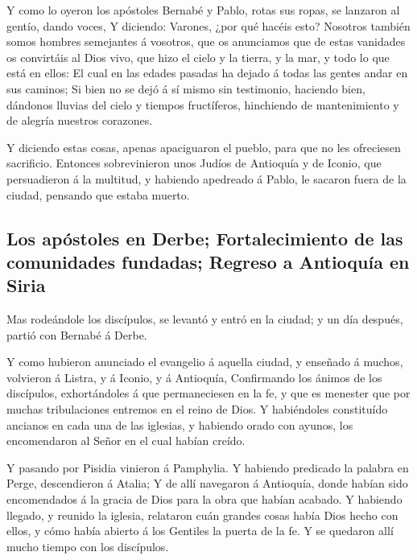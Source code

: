  Y como lo oyeron los apóstoles Bernabé y Pablo, rotas
sus ropas, se lanzaron al gentío, dando voces,  Y
diciendo: Varones, ¿por qué hacéis esto? Nosotros también somos hombres
semejantes á vosotros, que os anunciamos que de estas vanidades os
convirtáis al Dios vivo, que hizo el cielo y la tierra, y la mar, y todo
lo que está en ellos:  El cual en las edades pasadas ha
dejado á todas las gentes andar en sus caminos;  Si bien
no se dejó á sí mismo sin testimonio, haciendo bien, dándonos lluvias
del cielo y tiempos fructíferos, hinchiendo de mantenimiento y de
alegría nuestros corazones.

 Y diciendo estas cosas, apenas apaciguaron el pueblo,
para que no les ofreciesen sacrificio.  Entonces
sobrevinieron unos Judíos de Antioquía y de Iconio, que persuadieron á
la multitud, y habiendo apedreado á Pablo, le sacaron fuera de la
ciudad, pensando que estaba muerto.

\hypertarget{los-apuxf3stoles-en-derbe-fortalecimiento-de-las-comunidades-fundadas-regreso-a-antioquuxeda-en-siria}{%
\subsection{Los apóstoles en Derbe; Fortalecimiento de las comunidades
fundadas; Regreso a Antioquía en
Siria}\label{los-apuxf3stoles-en-derbe-fortalecimiento-de-las-comunidades-fundadas-regreso-a-antioquuxeda-en-siria}}

 Mas rodeándole los discípulos, se levantó y entró en la
ciudad; y un día después, partió con Bernabé á Derbe.

 Y como hubieron anunciado el evangelio á aquella ciudad,
y enseñado á muchos, volvieron á Listra, y á Iconio, y á Antioquía,
 Confirmando los ánimos de los discípulos, exhortándoles
á que permaneciesen en la fe, y que es menester que por muchas
tribulaciones entremos en el reino de Dios.  Y
habiéndoles constituído ancianos en cada una de las iglesias, y habiendo
orado con ayunos, los encomendaron al Señor en el cual habían creído.

 Y pasando por Pisidia vinieron á Pamphylia.
 Y habiendo predicado la palabra en Perge, descendieron á
Atalia;  Y de allí navegaron á Antioquía, donde habían
sido encomendados á la gracia de Dios para la obra que habían acabado.
 Y habiendo llegado, y reunido la iglesia, relataron cuán
grandes cosas había Dios hecho con ellos, y cómo había abierto á los
Gentiles la puerta de la fe.  Y se quedaron allí mucho
tiempo con los discípulos.

